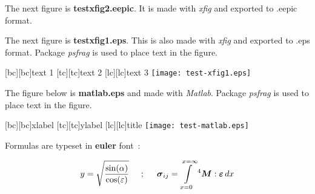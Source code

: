 \documentclass[11pt]{article}
\begin{document}
\setlength{\PSB}{0.00087489in}
\renewcommand{\picfontsize}{\normalsize}
\renewcommand{\FIG}[3]{%
\setlength{\unitlength}{#1#2}\mbox{} 
\begin{center} {\picfontsize #3 } \end{center}\mbox{}}

The next {\color{red}figure} is {\bf testxfig2.eepic}.
It is made with {\em xfig} and exported to .eepic format.
\\

\FIG{0.6}{\PSB}{}

The next {\color{red}figure} is {\bf testxfig1.eps}.
This is also made with {\em xfig} and exported to .eps format.
Package {\em psfrag} is used to place text in the figure.

\psfragscanon
{}[bc][bc]{text 1}
[tc][tc]{text 2}
[lc][lc]{\Large text 3}
\texttt{[image: test-xfig1.eps]}
\psfragscanoff

The {\color{red}figure} below is {\bf matlab.eps} and made with {\em Matlab}.
Package {\em psfrag} is used to place text in the figure.

\psfragscanon
{}[bc][bc]{xlabel}
[tc][tc]{ylabel}
[lc][lc]{title}
\texttt{[image: test-matlab.eps]}
\psfragscanoff

Formulas are typeset in {\bf euler} font~:

\[
   y = \sqrt{\frac{\sin(\alpha)}{\cos(\varepsilon)}}
   \hspace*{5mm};\hspace*{5mm}
   \mbox{\boldmath $\sigma$}_{ij} = 
   \int\limits_{x=0}^{x=\infty} 
   {^4 \mbox{\boldmath $M$}} : \mbox{\boldmath $\varepsilon$} \, dx
\]

\newpage

%


\end{document}
